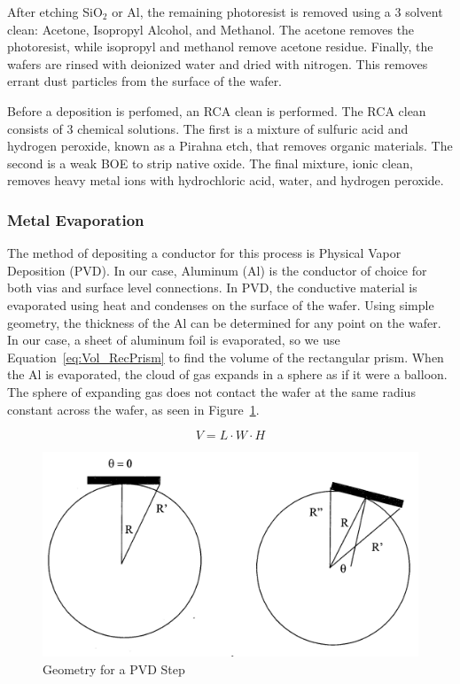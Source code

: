 \documentclass[letter,12pt]{article}
\begin{document}
			After etching SiO$_2$ or Al, the remaining photoresist is removed using a 3 solvent clean: Acetone, Isopropyl Alcohol, and Methanol. The acetone removes the photoresist, while isopropyl and methanol remove acetone residue. Finally, the wafers are rinsed with deionized water and dried with nitrogen. This removes errant dust particles from the surface of the wafer. \cite{Lab_Manual}
			
			Before a deposition is perfomed, an RCA clean is performed. The RCA clean consists of 3 chemical solutions.  The first is a mixture of sulfuric acid and hydrogen peroxide, known as a Pirahna etch, that removes organic materials.  The second is a weak BOE to strip native oxide.  The final mixture, ionic clean, removes heavy metal ions with hydrochloric acid, water, and hydrogen peroxide. \cite{Lab_Manual}
		
		\FloatBarrier
		\subsubsection{Metal Evaporation}
			The method of depositing a conductor for this process is Physical Vapor Deposition (PVD). In our case, Aluminum (Al) is the conductor of choice for both vias and surface level connections. In PVD, the conductive material is evaporated using heat and condenses on the surface of the wafer.  Using simple geometry, the thickness of the Al can be determined for any point on the wafer.  In our case, a sheet of aluminum foil is evaporated, so we use Equation~\ref{eq:Vol_RecPrism} to find the volume of the rectangular prism.  When the Al is evaporated, the cloud of gas expands in a sphere as if it were a balloon.  The sphere of expanding gas does not contact the wafer at the same radius constant across the wafer, as seen in Figure~\ref{fig:PVD_Geometry}.
			
			\begin{equation}
				V = L \cdot W \cdot H
				\label{eq:Vol_RecPrism}
			\end{equation}
			
			\begin{figure}[h!]
				\centering
				\includegraphics[width=\textwidth]{./Images/PVD_Geometry.png}
				\caption{Geometry for a PVD Step}
				\label{fig:PVD_Geometry}
			\end{figure}
			
\end{document}
